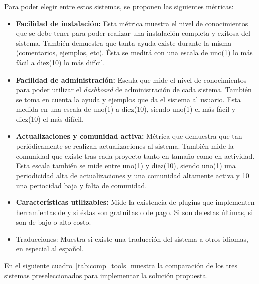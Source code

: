 Para poder elegir entre estos sistemas, se proponen las siguientes métricas:

\begin{itemize}

    \item {\bf Facilidad de instalación:}
        Esta métrica muestra el nivel de conocimientos que se debe
        tener para poder realizar una instalación completa y exitosa del sistema.
        También demuestra que tanta ayuda existe durante la misma (comentarios,
        ejemplos, etc).
        Ésta se medirá con una escala de uno(1) lo más fácil a diez(10) lo más difícil.

    \item {\bf Facilidad de administración:}
        Escala que mide el nivel de conocimientos para poder utilizar el
        \emph{dashboard} de administración de cada sistema.
        También se toma en cuenta la ayuda y ejemplos que da el sistema al usuario.
        Esta medida en una escala de uno(1) a diez(10), siendo uno(1) el más fácil y diez(10) 
	el más difícil.

    \item {\bf Actualizaciones y comunidad activa:}
        Métrica que demuestra que tan periódicamente se realizan actualizaciones
        al sistema.
        También mide la comunidad que existe tras cada proyecto tanto en tamaño
        como en actividad.
        Esta escala también se mide entre uno(1) y diez(10), siendo uno(1) una periodicidad 
	alta de actualizaciones y una comunidad altamente activa
	y 10 una periocidad baja y falta de comunidad.

    \item {\bf Características utilizables:}
        Mide la existencia de plugins que implementen herramientas de {\GAM}
        y si éstas son gratuitas o de pago.
        Si son de estas últimas, si son de bajo o alto costo.

    \item Traducciones:
        Muestra si existe una traducción del sistema a otros idiomas, en especial
        al español.

\end{itemize}

En el siguiente cuadro~\ref{tab:comp_tools} muestra la comparación de los tres
sistemas preseleccionados para implementar la solución propuesta.

